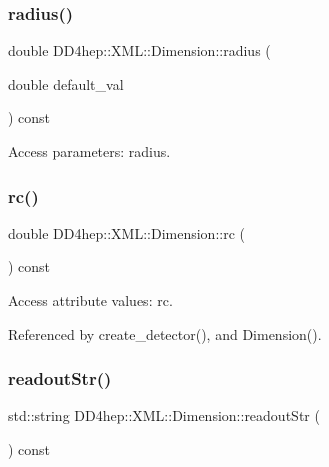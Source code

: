 \subsubsection{\texorpdfstring{radius()}{radius()}\hspace{0.1cm}{\footnotesize\ttfamily [2/2]}}
{\footnotesize\ttfamily double D\+D4hep\+::\+X\+M\+L\+::\+Dimension\+::radius (\begin{DoxyParamCaption}\item[{double}]{default\+\_\+val }\end{DoxyParamCaption}) const}



Access parameters\+: radius. 

\hypertarget{struct_d_d4hep_1_1_x_m_l_1_1_dimension_ada8d95127d37cb46b85183d577323f3a}{}\label{struct_d_d4hep_1_1_x_m_l_1_1_dimension_ada8d95127d37cb46b85183d577323f3a} 
\subsubsection{\texorpdfstring{rc()}{rc()}}
{\footnotesize\ttfamily double D\+D4hep\+::\+X\+M\+L\+::\+Dimension\+::rc (\begin{DoxyParamCaption}{ }\end{DoxyParamCaption}) const}



Access attribute values\+: rc. 



Referenced by create\+\_\+detector(), and Dimension().

\hypertarget{struct_d_d4hep_1_1_x_m_l_1_1_dimension_ada45ea46d8bf5ffe55bdbe73a4cfbab7}{}\label{struct_d_d4hep_1_1_x_m_l_1_1_dimension_ada45ea46d8bf5ffe55bdbe73a4cfbab7} 
\subsubsection{\texorpdfstring{readout\+Str()}{readoutStr()}}
{\footnotesize\ttfamily std\+::string D\+D4hep\+::\+X\+M\+L\+::\+Dimension\+::readout\+Str (\begin{DoxyParamCaption}{ }\end{DoxyParamCaption}) const}



